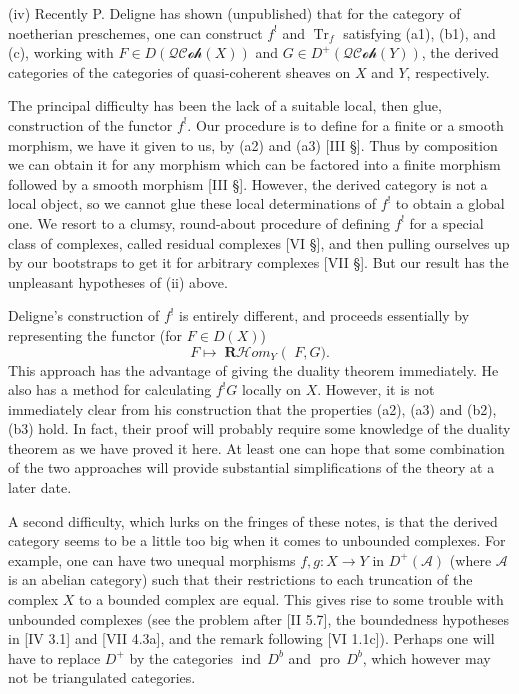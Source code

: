 \documentclass[12pt]{book}
\newcommand{\cat}[1]{\mathcal{#1}}
\DeclareMathOperator{\Rfst}{\mathbf{R}f_*}
\DeclareMathOperator{\RHom}{\mathbf{R}\mathcal{H}\textit{om}}
\begin{document}
\setcounter{page}{10}

(iv) Recently P. Deligne has shown (unpublished) that for the category of noetherian preschemes, one can construct \(f^{!}\) and \(\operatorname{Tr}_{f}\) satisfying (a1), (b1), and (c), working with \(F\in D(\cat{QCoh}(X))\) and \(G\in D^{+}(\cat{QCoh}(Y))\), the derived categories of the categories of quasi-coherent sheaves on \(X\) and \(Y\), respectively.

The principal difficulty has been the lack of a suitable local, then glue, construction of the functor \(f^{!}\). Our procedure is to define for a finite or a smooth morphism, we have it given to us, by (a2) and (a3) [III \S]. Thus by composition we can obtain it for any morphism which can be factored into a finite morphism followed by a smooth morphism [III \S]. However, the derived category is not a local object, so we cannot glue these local determinations of \(f^{!}\) to obtain a global one. We resort to a clumsy, round-about procedure of defining \(f^{!}\) for a special class of complexes, called residual complexes [VI \S], and then pulling ourselves up by our bootstraps to get it for arbitrary complexes [VII \S]. But our result has the unpleasant hypotheses of (ii) above.

Deligne's construction of \(f^{!}\) is entirely different, and proceeds essentially by representing the functor (for \(F\in D(X)\))
\[
F \longmapsto \RHom_{Y}\bigl(\Rfst F, G\bigr).
\]
This approach has the advantage of giving the duality theorem immediately. He also has a method for calculating \(f^{!}G\) locally on \(X\). However, it is not immediately clear from his construction that the properties (a2), (a3) and (b2), (b3) hold. In fact, their proof will probably require some knowledge of the duality theorem as we have proved it here. At least one can hope that some combination of the two approaches will provide substantial simplifications of the theory at a later date.

\setcounter{page}{12}

A second difficulty, which lurks on the fringes of these notes, is that the derived category seems to be a little too big when it comes to unbounded complexes.
For example, one can have two unequal morphisms \(f,g\colon X\to Y\) in \(D^{+}(\cat{A})\) (where \(\cat{A}\) is an abelian category) such that their restrictions to each truncation of the complex \(X\) to a bounded complex are equal. This gives rise to some trouble with unbounded complexes (see the problem after [II 5.7], the boundedness hypotheses in [IV 3.1] and [VII 4.3a], and the remark following [VI 1.1c]). Perhaps one will have to replace \(D^{+}\) by the categories \(\operatorname{ind}\,D^{b}\) and \(\operatorname{pro}\,D^{b}\), which however may not be triangulated categories.
\end{document}
